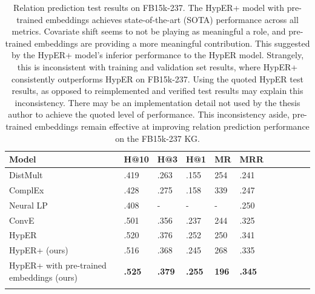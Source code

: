 \begin{table}[H]
		\centering
		\begin{tabular}{lllllllllll}
  			\textbf{Model} & \textbf{H@10} & \textbf{H@3} & \textbf{H@1} & \textbf{MR} & \textbf{MRR} \\
  			\hline
  			DistMult \unskip~\citep{yang2014embedding} & .419 & .263 & .155 & 254 & .241 \\
  			ComplEx \unskip~\citep{trouillon2016complex} & .428 & .275 & .158 & 339 & .247 \\
  			Neural LP  \unskip~\citep{yang2017differentiable} & .408 & - & - & - & .250 \\
			ConvE \unskip~\citep{dettmers2018convolutional} & .501 & .356 & .237 & 244 & .325 \\
			HypER \unskip~\citep{balazevic2019hypernetwork} & .520 & .376 & .252 & 250 & .341 \\
			HypER+ (ours) & .516 & .368 & .245 & 268 & .335 \\
  			\hline
  			HypER+ with pre-trained embeddings (ours) & \textbf{.525} & \textbf{.379} & \textbf{.255} & \textbf{196} & \textbf{.345} \\
			&
		\end{tabular}
		\captionsetup{justification=centering}
		\caption{Relation prediction test results on FB15k-237. The HypER+ model with pre-trained embeddings achieves state-of-the-art (SOTA) performance across all metrics. Covariate shift seems to not be playing as meaningful a role, and pre-trained embeddings are providing a more meaningful contribution. This suggested by the HypER+ model's inferior performance to the HypER model. Strangely, this is inconsistent with training and validation set results, where HypER+ consistently outperforms HypER on FB15k-237. Using the quoted HypER test results, as opposed to reimplemented and verified test results may explain this inconsistency. There may be an implementation detail not used by the thesis author to achieve the quoted level of performance. This inconsistency aside, pre-trained embeddings remain effective at improving relation prediction performance on the FB15k-237 KG.}
\end{table}



